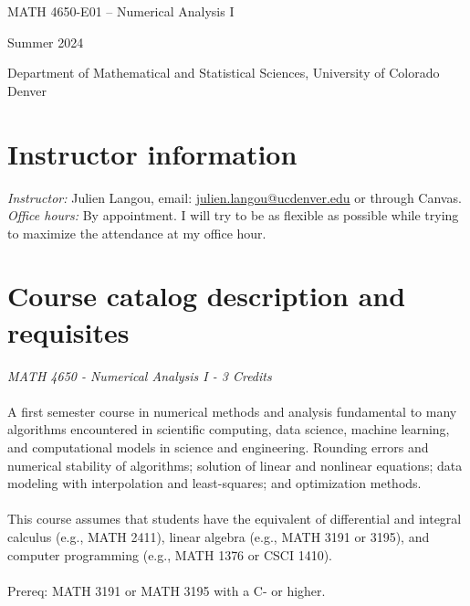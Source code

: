 \documentclass[letterpaper,10pt]{article}
\newcommand{\mailto}[1]{\href{mailto:#1}{#1}}
\begin{document}
\begin{center}{\LARGE
MATH 4650-E01 -- Numerical Analysis I
}
\bigskip

Summer 2024


Department of Mathematical and Statistical Sciences, University of Colorado Denver
\end{center}\vspace*{-1em}


\section*{Instructor information}

\emph{Instructor:} Julien Langou,
email: \mailto{julien.langou@ucdenver.edu} or through Canvas.\\

\emph{Office hours:} By appointment. I will try to be as
flexible as possible while trying to maximize the attendance at my office hour.\\

\medskip

\section*{Course catalog description and requisites}


\emph{MATH 4650 -  Numerical Analysis I - 3 Credits}\\
\\
A first semester course in numerical methods and analysis fundamental to many
algorithms encountered in scientific computing, data science, machine learning,
and computational models in science and engineering. Rounding errors and
numerical stability of algorithms; solution of linear and nonlinear equations;
data modeling with interpolation and least-squares; and optimization methods.\\
\\
This course assumes that students have the equivalent of differential and
integral calculus (e.g., MATH 2411), linear algebra (e.g., MATH 3191 or 3195),
and computer programming (e.g., MATH 1376 or CSCI 1410).\\
\\
Prereq: MATH 3191 or MATH 3195 with a C- or higher.\\ 
\\
\end{document}
